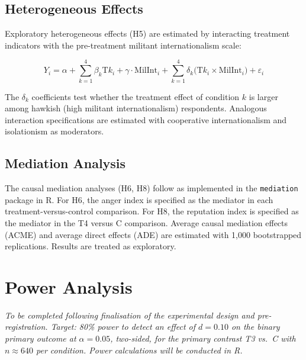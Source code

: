 \subsection{Heterogeneous Effects}

Exploratory heterogeneous effects (H5) are estimated by interacting treatment indicators with the pre-treatment militant internationalism scale:

\begin{equation}
    Y_i = \alpha + \sum_{k=1}^{4} \beta_k \text{T}k_i + \gamma \cdot \text{MilInt}_i + \sum_{k=1}^{4} \delta_k \bigl(\text{T}k_i \times \text{MilInt}_i\bigr) + \varepsilon_i
\end{equation}

The $\delta_k$ coefficients test whether the treatment effect of condition $k$ is larger among hawkish (high militant internationalism) respondents. Analogous interaction specifications are estimated with cooperative internationalism and isolationism as moderators.

\subsection{Mediation Analysis}

The causal mediation analyses (H6, H8) follow \textcite{imai_general_2010} as implemented in the \texttt{mediation} package in R.\autocite{tingley_mediation_2014} For H6, the anger index is specified as the mediator in each treatment-versus-control comparison. For H8, the reputation index is specified as the mediator in the T4 versus C comparison. Average causal mediation effects (ACME) and average direct effects (ADE) are estimated with 1{,}000 bootstrapped replications. Results are treated as exploratory.


\section{Power Analysis}

\textit{To be completed following finalisation of the experimental design and pre-registration. Target: 80\% power to detect an effect of $d = 0.10$ on the binary primary outcome at $\alpha = 0.05$, two-sided, for the primary contrast T3 vs.\ C with $n \approx 640$ per condition. Power calculations will be conducted in R.}


